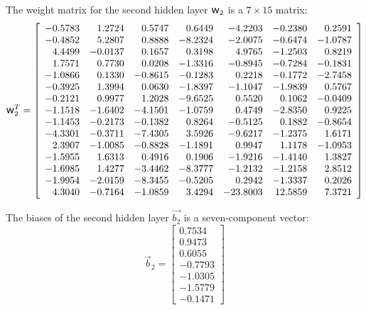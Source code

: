 \documentclass[metals,article,accept,pdftex,moreauthors]{Definitions/mdpi}
\DeclareRobustCommand{\w}{\mbox{\large\ensuremath{\mathsf{w}}}}
\begin{document}
The weight matrix for the second hidden layer $\w_2$ is a $7\times15$ matrix:
\begin{equation*}
\w_2^T = \left[
\begin{array}{rrrrrrr}
-0.5783 & 1.2724 & 0.5747 & 0.6449 & -4.2203 & -0.2380 & 0.2591 \\
-0.4852 & 5.2807 & 0.8888 & -8.2324 & -2.0075 & -0.6474 & -1.0787 \\
4.4499 & -0.0137 & 0.1657 & 0.3198 & 4.9765 & -1.2503 & 0.8219 \\
1.7571 & 0.7730 & 0.0208 & -1.3316 & -0.8945 & -0.7284 & -0.1831 \\
-1.0866 & 0.1330 & -0.8615 & -0.1283 & 0.2218 & -0.1772 & -2.7458 \\
-0.3925 & 1.3994 & 0.0630 & -1.8397 & -1.1047 & -1.9839 & 0.5767 \\
-0.2121 & 0.9977 & 1.2028 & -9.6525 & 0.5520 & 0.1062 & -0.0409 \\
-1.1518 & -1.6402 & -4.1501 & -1.0759 & 0.4749 & -2.8350 & 0.9225 \\
-1.1453 & -0.2173 & -0.1382 & 0.8264 & -0.5125 & 0.1882 & -0.8654 \\
-4.3301 & -0.3711 & -7.4305 & 3.5926 & -9.6217 & -1.2375 & 1.6171 \\
2.3907 & -1.0085 & -0.8828 & -1.1891 & 0.9947 & 1.1178 & -1.0953 \\
-1.5955 & 1.6313 & 0.4916 & 0.1906 & -1.9216 & -1.4140 & 1.3827 \\
-1.6985 & 1.4277 & -3.4462 & -8.3777 & -1.2132 & -1.2158 & 2.8512 \\
-1.9954 & -2.0159 & -8.3455 & -0.5205 & 0.2942 & -1.3337 & 0.2026 \\
4.3040 & -0.7164 & -1.0859 & 3.4294 & -23.8003 & 12.5859 & 7.3721
\end{array}\right]
\end{equation*}

The biases of the second hidden layer $\overrightarrow{b_2}$ is a seven-component vector:
\begin{equation*}
\overrightarrow{b}_2 = \left[
\begin{array}{r}
0.7534 \\
0.9473 \\
0.6055 \\
-0.7793 \\
-1.0305 \\
-1.5779 \\
-0.1471
\end{array}\right]
\end{equation*}
\end{document}
